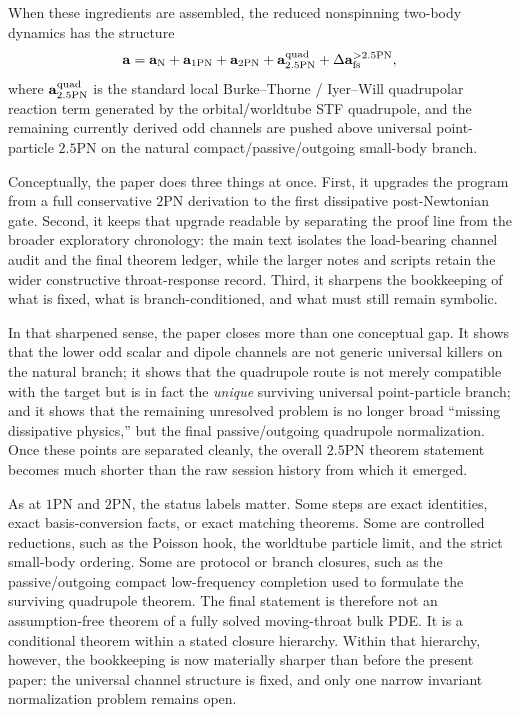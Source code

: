 \documentclass[11pt]{article}
\begin{document}
When these ingredients are assembled, the reduced nonspinning two-body dynamics
has the structure
\[
\mathbf a
=
\mathbf a_{\rm N}
+\mathbf a_{1\rm PN}
+\mathbf a_{2\rm PN}
+\mathbf a_{2.5\rm PN}^{\rm quad}
+\Delta\mathbf a_{\rm fs}^{>2.5\rm PN},
\]
where $\mathbf a_{2.5\rm PN}^{\rm quad}$ is the standard local
Burke--Thorne / Iyer--Will quadrupolar reaction term generated by the
orbital/worldtube STF quadrupole, and the remaining currently derived odd
channels are pushed above universal point-particle $2.5$PN on the natural
compact/passive/outgoing small-body branch.

Conceptually, the paper does three things at once.  First, it upgrades the
program from a full conservative $2$PN derivation to the first dissipative
post-Newtonian gate.  Second, it keeps that upgrade readable by separating the
proof line from the broader exploratory chronology: the main text isolates the
load-bearing channel audit and the final theorem ledger, while the larger notes
and scripts retain the wider constructive throat-response record.  Third, it
sharpens the bookkeeping of what is fixed, what is branch-conditioned, and what
must still remain symbolic.

In that sharpened sense, the paper closes more than one conceptual gap.  It
shows that the lower odd scalar and dipole channels are not generic universal
killers on the natural branch; it shows that the quadrupole route is not merely
compatible with the target but is in fact the \emph{unique} surviving universal
point-particle branch; and it shows that the remaining unresolved problem is no
longer broad ``missing dissipative physics,'' but the final passive/outgoing
quadrupole normalization.  Once these points are separated cleanly, the overall
$2.5$PN theorem statement becomes much shorter than the raw session history from
which it emerged.

As at $1$PN and $2$PN, the status labels matter.  Some steps are exact
identities, exact basis-conversion facts, or exact matching theorems.  Some are
controlled reductions, such as the Poisson hook, the worldtube particle limit,
and the strict small-body ordering.  Some are protocol or branch closures, such
as the passive/outgoing compact low-frequency completion used to formulate the
surviving quadrupole theorem.  The final statement is therefore not an
assumption-free theorem of a fully solved moving-throat bulk PDE.  It is a
conditional theorem within a stated closure hierarchy.  Within that hierarchy,
however, the bookkeeping is now materially sharper than before the present
paper: the universal channel structure is fixed, and only one narrow invariant
normalization problem remains open.
\end{document}
